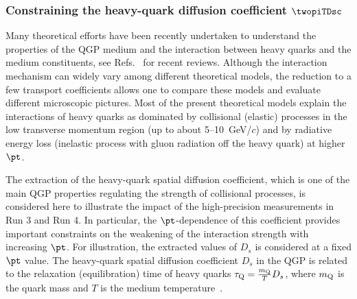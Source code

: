 \subsubsection{Constraining the heavy-quark diffusion coefficient $\twopiTDsc$}
\label{sec:HFDs}

Many theoretical efforts have been recently undertaken to understand the properties of the QGP medium and the interaction between heavy quarks and the medium constituents, see Refs.~\cite{Andronic:2015wma,Prino:2016cni,Rapp:2018qla} for recent reviews. 
Although the interaction mechanism can widely vary among different theoretical models, the reduction to a few transport coefficients allows one to compare these models and evaluate different microscopic pictures. 
Most of the present theoretical models explain the interactions of heavy quarks as dominated by collisional (elastic) processes in the low transverse momentum region (up to about 5--10~GeV/$c$) and by radiative energy loss (inelastic process with gluon radiation off the heavy quark) at higher $\pt$.

The extraction of the heavy-quark spatial diffusion coefficient, which is one of the main QGP properties regulating the strength of collisional processes, is considered here to illustrate the impact of the high-precision measurements in Run 3 and Run 4. In particular, the $\pt$-dependence of this coefficient provides important constraints on the weakening of the interaction strength with increasing $\pt$. For illustration, the extracted values of $D_s$ is considered at a fixed $\pt$ value. The heavy-quark spatial diffusion coefficient $D_s$ in the QGP is related to the relaxation (equilibration) time of heavy quarks $\tau_{\rm Q} = \frac{m_{\rm Q}}{T}D_s$, where $m_{\rm Q}$ is the quark mass and $T$ is the medium temperature~\cite{Moore:2004tg}.  




